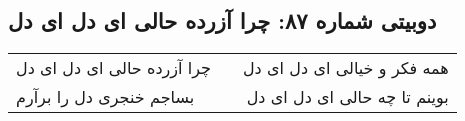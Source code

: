 \begin{center}
\section*{دوبیتی شماره ۸۷: چرا آزرده حالی ای دل ای دل}
\label{sec:087}
\begin{longtable}{l p{0.5cm} r}
چرا آزرده حالی ای دل ای دل
&&
همه فکر و خیالی ای دل ای دل
\\
بساجم خنجری دل را برآرم
&&
بوینم تا چه حالی ای دل ای دل
\\
\end{longtable}
\end{center}
